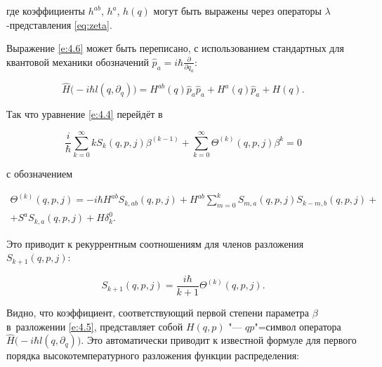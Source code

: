 где коэффициенты $h^{ab}$, $h^{a}$, $h(q)$ могут быть выражены через операторы $\lambda$-представления \eqref{eq:zeta}. 

Выражение \eqref{e:4.6} может быть переписано, с использованием стандартных для квантовой механики обозначений $\hat p_a = i \hbar \frac{\partial}{\partial q_a}$:

\begin{equation}\label{e:4.6_1}

\hat H\bigl(-i \hbar l(q, \partial_q)\bigr)= H^{ab}(q)\hat p_a \hat p_a +H^{a}(q) \hat p_a + H(q).

\end{equation}

Так что уравнение \eqref{e:4.4} перейдёт в

\begin{equation}\label{e:4.7}

\frac{i}{\hbar}\sum \limits_{k=0}^{\infty} k S_{k}(q,p,j)\beta^{(k-1)}+

\sum \limits _{k=0}^{\infty} \Theta^{(k)}(q,p,j) \beta^k=0

\end{equation}

с обозначением

\begin{multline}

\Theta^{(k)}(q,p,j)=-i \hbar H^{ab} S_{k,ab}(q,p,j)+

 H^{ab} \sum \limits_{m=0}^{k} S_{m,a}(q,p,j) S_{k-m,b}(q,p,j)+\\+

 S^a S_{k,a}(q,p,j)+H\delta_{k}^{0}.

\end{multline}

Это приводит к рекуррентным соотношениям для членов разложения $S_{k+1}(q,p,j)$:

\begin{equation}\label{e:4.8}

 S_{k+1}(q,p,j)=\frac{i \hbar}{k+1}\Theta^{(k)}(q,p,j).

\end{equation}

Видно, что коэффициент, соответствующий первой степени параметра $\beta$ в~разложении \eqref{e:4.5}, представляет собой $H(q,p)$ "--- $qp$"=символ оператора $\hat H\bigl(-i \hbar l(q, \partial_q)\bigr)$.  Это автоматически приводит к известной формуле для первого порядка высокотемпературного разложения функции распределения:

$$

